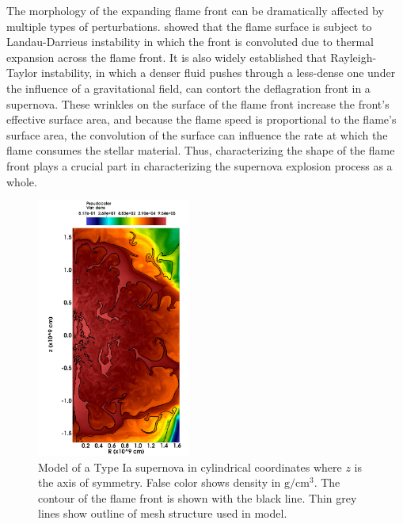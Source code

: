 \documentclass{emulateapj}
\begin{document}
The morphology of the expanding flame front can be dramatically affected by multiple types of perturbations. \cite{Landau1959} showed that the flame surface is subject to Landau-Darrieus instability in which the front is convoluted due to thermal expansion across the flame front. It is also widely established \citep{Khokhlov} that Rayleigh-Taylor instability, in which a denser fluid pushes through a less-dense one under the influence of a gravitational field, can contort the deflagration front in a supernova. These wrinkles on the surface of the flame front increase the front's effective surface area, and because the flame speed is proportional to the flame's surface area, the convolution of the surface can influence the rate at which the flame consumes the stellar material. Thus, characterizing the shape of the flame front plays a crucial part in characterizing the supernova explosion process as a whole.

\begin{figure}[ht]
	\begin{center}
	\includegraphics[width=0.45\textwidth,clip=true]{Graphics/n7d1r10t15b0011_cropped.png}
	\caption{Model of a Type Ia supernova in cylindrical coordinates where $z$ is the axis of symmetry. False color shows density in $\mathrm{g/cm^3}$. The contour of the flame front is shown with the black line. Thin grey lines show outline of mesh structure used in model.
	\label{f:flamefrontwithcontour}}
	\end{center}
	\end{figure} 
\end{document}
